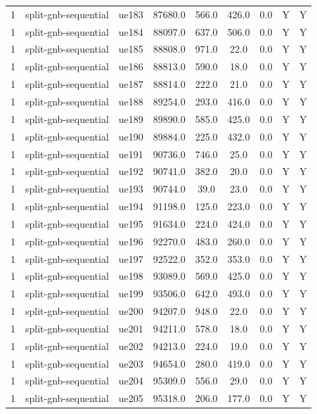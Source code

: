 \begin{table}[ht]
\begin{tabular}{|c|c|c|c|c|c|c|c|c|}
1 & split-gnb-sequential & ue183 & 87680.0 & 566.0 & 426.0 & 0.0 & Y & Y \\
1 & split-gnb-sequential & ue184 & 88097.0 & 637.0 & 506.0 & 0.0 & Y & Y \\
1 & split-gnb-sequential & ue185 & 88808.0 & 971.0 & 22.0 & 0.0 & Y & Y \\
1 & split-gnb-sequential & ue186 & 88813.0 & 590.0 & 18.0 & 0.0 & Y & Y \\
1 & split-gnb-sequential & ue187 & 88814.0 & 222.0 & 21.0 & 0.0 & Y & Y \\
1 & split-gnb-sequential & ue188 & 89254.0 & 293.0 & 416.0 & 0.0 & Y & Y \\
1 & split-gnb-sequential & ue189 & 89890.0 & 585.0 & 425.0 & 0.0 & Y & Y \\
1 & split-gnb-sequential & ue190 & 89884.0 & 225.0 & 432.0 & 0.0 & Y & Y \\
1 & split-gnb-sequential & ue191 & 90736.0 & 746.0 & 25.0 & 0.0 & Y & Y \\
1 & split-gnb-sequential & ue192 & 90741.0 & 382.0 & 20.0 & 0.0 & Y & Y \\
1 & split-gnb-sequential & ue193 & 90744.0 & 39.0 & 23.0 & 0.0 & Y & Y \\
1 & split-gnb-sequential & ue194 & 91198.0 & 125.0 & 223.0 & 0.0 & Y & Y \\
1 & split-gnb-sequential & ue195 & 91634.0 & 224.0 & 424.0 & 0.0 & Y & Y \\
1 & split-gnb-sequential & ue196 & 92270.0 & 483.0 & 260.0 & 0.0 & Y & Y \\
1 & split-gnb-sequential & ue197 & 92522.0 & 352.0 & 353.0 & 0.0 & Y & Y \\
1 & split-gnb-sequential & ue198 & 93089.0 & 569.0 & 425.0 & 0.0 & Y & Y \\
1 & split-gnb-sequential & ue199 & 93506.0 & 642.0 & 493.0 & 0.0 & Y & Y \\
1 & split-gnb-sequential & ue200 & 94207.0 & 948.0 & 22.0 & 0.0 & Y & Y \\
1 & split-gnb-sequential & ue201 & 94211.0 & 578.0 & 18.0 & 0.0 & Y & Y \\
1 & split-gnb-sequential & ue202 & 94213.0 & 224.0 & 19.0 & 0.0 & Y & Y \\
1 & split-gnb-sequential & ue203 & 94654.0 & 280.0 & 419.0 & 0.0 & Y & Y \\
1 & split-gnb-sequential & ue204 & 95309.0 & 556.0 & 29.0 & 0.0 & Y & Y \\
1 & split-gnb-sequential & ue205 & 95318.0 & 206.0 & 177.0 & 0.0 & Y & Y \\

\end{tabular}
\end{table}
